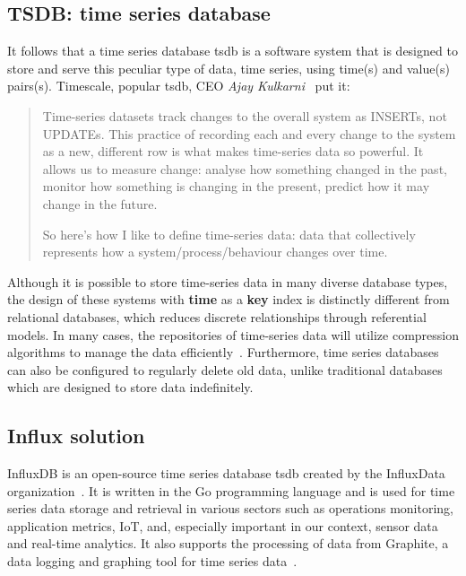 \subsection{TSDB: time series database}
It follows that a time series database \acs{tsdb} is a software system that is designed to store and serve this peculiar type of data, time series, using time(s) and value(s) pairs(s).
Timescale, popular \ac{tsdb}, CEO \textit{Ajay Kulkarni}~\cite{Misc:asay_why_time_series} put it:
\begin{quote}
    Time-series datasets track changes to the overall system
    as INSERTs, not UPDATEs.
    This practice of recording each and every change to the system as a new, different row is what makes time-series data so powerful.
    It allows us to measure change: analyse how something changed in the past, monitor how something is changing in the present, predict how it may change in the future.

    So here's how I like to define time-series data: data that collectively represents how a system/process/behaviour changes over time.
\end{quote}
Although it is possible to store time-series data in many diverse database types, the design of these systems with \textbf{time} as a \textbf{key} index is distinctly different from relational databases, which reduces discrete relationships through referential models.
In many cases, the repositories of time-series data will utilize compression algorithms to manage the data efficiently~\cite{Book:devops_cookbook}. Furthermore, time series databases can also be configured to regularly delete old data, unlike traditional databases which are designed to store data indefinitely.

\subsection{Influx solution}
InfluxDB is an open-source time series database \acs{tsdb} created by the InfluxData organization~\cite{Misc:influxdata_website}.
It is written in the Go programming language and is used for time series data storage and retrieval in various sectors such as operations monitoring, application metrics, \acl{IoT}, and, especially important in our context, sensor data and real-time analytics.
It also supports the processing of data from Graphite, a data logging and graphing tool for time series data~\cite{Misc:thegraphiteproject_2021_graphite}.


